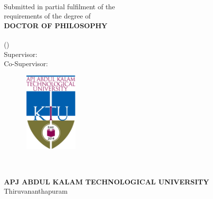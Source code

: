 \thispagestyle{empty}
\graphicspath{{Figures/PNG/}{Figures/}}
\doublespacing
\begin{center}
\vspace{12mm}
{\fontsize{22pt}{26pt}\textbf{\thetitle}} \\
\vspace{8mm}
{Submitted in partial fulfilment of the \\ requirements of the degree of} \\
\vspace{8mm}
\large
{\textbf{DOCTOR OF PHILOSOPHY}} \\
\vspace{5mm}
\fontsize{15pt}{18pt}\textbf{ \thescholar }\vspace{-0.2cm}\\ (\theregnumber)\\

Supervisor: \thesupervisor\\ 
\vspace{-.2cm}
Co-Supervisor: \thecosupervisor\\ 
\vspace{5mm}
\begin{figure}[h!]
\centering

\includegraphics[height=4cm,width=3cm]{Figures/ktu_logo.png}
\end{figure}
\par\vspace{4mm}
{ \thedepartment\\

\thecollege\\
\textbf {\large {APJ ABDUL KALAM TECHNOLOGICAL UNIVERSITY}}\\

Thiruvananthapuram \\
\theyear}

\end{center}
\thispagestyle{empty}
\onehalfspacing